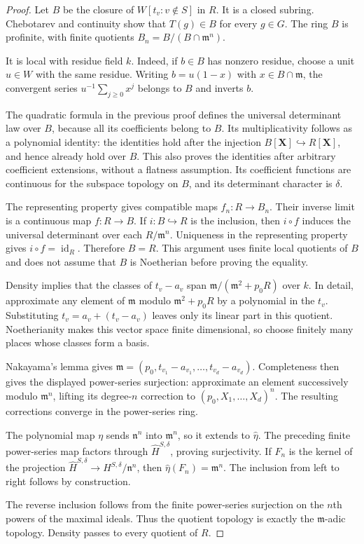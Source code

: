 \begin{proof}
Let $B$ be the closure of $W[t_v:v\notin S]$ in $R$.
It is a closed subring. Chebotarev and continuity show that
$T(g)\in B$ for every $g\in G$.
The ring $B$ is profinite, with finite quotients
$B_n=B/(B\cap\mathfrak m^n)$.

It is local with residue field $k$.
Indeed, if $b\in B$ has nonzero residue, choose a unit $u\in W$
with the same residue. Writing $b=u(1-x)$ with
$x\in B\cap\mathfrak m$, the convergent series
$u^{-1}\sum_{j\geq0}x^j$ belongs to $B$ and inverts $b$.

The quadratic formula in the previous proof defines the universal
determinant law over $B$, because all its coefficients belong to $B$.
Its multiplicativity follows as a polynomial identity: the identities
hold after the injection $B[\mathbf X]\hookrightarrow R[\mathbf X]$,
and hence already hold over $B$. This also proves the identities after
arbitrary coefficient extensions, without a flatness assumption.
Its coefficient functions are continuous for the subspace topology
on $B$, and its determinant character is $\delta$.

The representing property gives compatible maps $f_n:R\to B_n$.
Their inverse limit is a continuous map $f:R\to B$.
If $i:B\hookrightarrow R$ is the inclusion, then $i\circ f$
induces the universal determinant over each $R/\mathfrak m^n$.
Uniqueness in the representing property gives
$i\circ f=\operatorname{id}_R$. Therefore $B=R$.
This argument uses finite local quotients of $B$ and does not assume
that $B$ is Noetherian before proving the equality.

Density implies that the classes of $t_v-a_v$ span
$\mathfrak m/(\mathfrak m^2+p_0R)$ over $k$.
In detail, approximate any element of $\mathfrak m$ modulo
$\mathfrak m^2+p_0R$ by a polynomial in the $t_v$. Substituting
$t_v=a_v+(t_v-a_v)$ leaves only its linear part in this quotient.
Noetherianity makes this vector space finite dimensional, so choose
finitely many places whose classes form a basis.

Nakayama's lemma gives
$\mathfrak m=(p_0,t_{v_1}-a_{v_1},\ldots,t_{v_d}-a_{v_d})$.
Completeness then gives the displayed power-series surjection:
approximate an element successively modulo $\mathfrak m^n$, lifting
its degree-$n$ correction to $(p_0,X_1,\ldots,X_d)^n$.
The resulting corrections converge in the power-series ring.

The polynomial map $\eta$ sends $\mathfrak n^n$ into
$\mathfrak m^n$, so it extends to $\widehat\eta$.
The preceding finite power-series map factors through
$\widehat H^{S,\delta}$, proving surjectivity.
If $F_n$ is the kernel of the projection
$\widehat H^{S,\delta}\to H^{S,\delta}/\mathfrak n^n$, then
$\widehat\eta(F_n)=\mathfrak m^n$.
The inclusion from left to right follows by construction.

The reverse
inclusion follows from the finite power-series surjection on the
$n$th powers of the maximal ideals. Thus the quotient topology is
exactly the $\mathfrak m$-adic topology.
Density passes to every quotient of $R$.
\end{proof}

